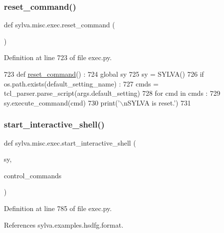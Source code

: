 \subsubsection{\texorpdfstring{reset\+\_\+command()}{reset\_command()}}
{\footnotesize\ttfamily def sylva.\+misc.\+exec.\+reset\+\_\+command (\begin{DoxyParamCaption}{ }\end{DoxyParamCaption})}



Definition at line 723 of file exec.\+py.


\begin{DoxyCode}
723 \textcolor{keyword}{def }\hyperlink{namespacesylva_1_1misc_1_1exec_a670ec00a77a111ff274f7d3dc3989966}{reset\_command}() :
724   \textcolor{keyword}{global} sy
725   sy = SYLVA()
726   \textcolor{keywordflow}{if} os.path.exists(default\_setting\_name) :
727     cmds = tcl\_parser.parse\_script(args.default\_setting)
728     \textcolor{keywordflow}{for} cmd \textcolor{keywordflow}{in} cmds :
729       sy.execute\_command(cmd)
730   print(\textcolor{stringliteral}{'\(\backslash\)nSYLVA is reset.'})
731 
\end{DoxyCode}
\mbox{\label{namespacesylva_1_1misc_1_1exec_a75779a3eb47b91a0f69020b264c0bd2d}} 
\subsubsection{\texorpdfstring{start\+\_\+interactive\+\_\+shell()}{start\_interactive\_shell()}}
{\footnotesize\ttfamily def sylva.\+misc.\+exec.\+start\+\_\+interactive\+\_\+shell (\begin{DoxyParamCaption}\item[{}]{sy,  }\item[{}]{control\+\_\+commands }\end{DoxyParamCaption})}



Definition at line 785 of file exec.\+py.



References sylva.\+examples.\+hsdfg.\+format.


